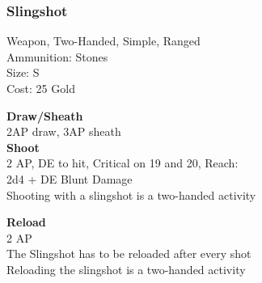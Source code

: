 \subsubsection{Slingshot}\label{weapon:slingshot}
Weapon, Two-Handed, Simple, Ranged\\
Ammunition: Stones\\
Size: S\\
Cost: 25 Gold

\textbf{Draw/Sheath}\\
2AP draw, 3AP sheath\\

\textbf{Shoot}\\
2 AP, DE to hit, Critical on 19 and 20,  Reach:\\
2d4 + \texttimes DE Blunt Damage\\
Shooting with a slingshot is a two-handed activity

\textbf{Reload}\\
2 AP\\
The Slingshot has to be reloaded after every shot\\
Reloading the slingshot is a two-handed activity
